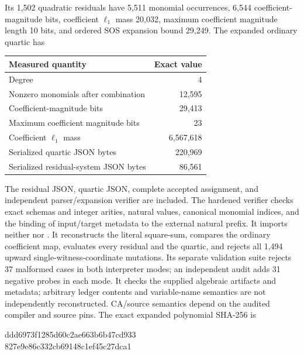 \documentclass[11pt,a4paper]{article}
\numberwithin{equation}{section}
\newcommand{\file}[1]{\texttt{\detokenize{#1}}}
\begin{document}
Its 1,502 quadratic residuals have 5,511 monomial occurrences, 6,544 coefficient-magnitude bits, coefficient $\ell_1$ mass 20,032, maximum coefficient magnitude length 10 bits, and ordered SOS expansion bound 29,249. The expanded ordinary quartic has
\begin{center}
\begin{tabular}{@{}lr@{}}\toprule
Measured quantity & Exact value\\\midrule
Degree & 4\\
Nonzero monomials after combination & 12,595\\
Coefficient-magnitude bits & 29,413\\
Maximum coefficient magnitude bits & 23\\
Coefficient $\ell_1$ mass & 6,567,618\\
Serialized quartic JSON bytes & 220,969\\
Serialized residual-system JSON bytes & 86,561\\\bottomrule
\end{tabular}
\end{center}
The residual JSON, quartic JSON, complete accepted assignment, and independent parser/expansion verifier are included. The hardened verifier checks exact schemas and integer arities, natural values, canonical monomial indices, and the binding of input/target metadata to the external natural prefix. It imports neither \file{compiler.py} nor \file{circuit.py}. It reconstructs the literal square-sum, compares the ordinary coefficient map, evaluates every residual and the quartic, and rejects all 1,494 upward single-witness-coordinate mutations. Its separate validation suite rejects 37 malformed cases in both interpreter modes; an independent audit adds 31 negative probes in each mode. It checks the supplied algebraic artifacts and metadata; arbitrary ledger contents and variable-name semantics are not independently reconstructed. CA/source semantics depend on the audited compiler and source pins. The exact expanded polynomial SHA-256 is
\begin{center}\ttfamily\small
ddd6973f1285d60c2ae663b6b47cd933\\
827e9e86c332cb69148c1ef45c27dca1
\end{center}
\end{document}
